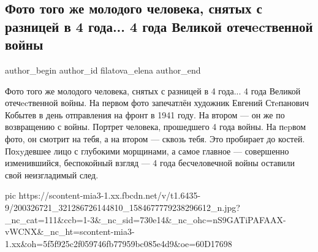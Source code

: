  
 
 
 
 
 
\subsection{Фото того же молодого человека, снятых с разницей в 4 года... 4 года Великой отечecтвенной войны}
\label{sec:17_06_2021.fb.filatova_elena.1.foto_vov_soldat_dusha_vzgljad}
\ifcmt
 author_begin
   author_id filatova_elena
 author_end
\fi

Фото того же молодого человека, снятых с разницей в 4 года... 4 года Великой
отечecтвенной войны. На первом фото запечатлён художник Евгений Стeпанович
Кобытев в день отправления на фронт в 1941 году. На втором — он же по
возвращению с войны. Портрет человека, прошедшего 4 года войны. На пepвом фото,
он смотрит на тебя, а на втором — сквозь тебя. Это пробирает до костей.
Поxyдевшее лицо с глубокими морщинами, а самое главное — совершенно
изменившийся, беспокойный взгляд — 4 года бесчеловечной войны оставили свой
неизгладимый след.

\ifcmt
  pic https://scontent-mia3-1.xx.fbcdn.net/v/t1.6435-9/200326721_321286726144810_1584677779238296612_n.jpg?_nc_cat=111&ccb=1-3&_nc_sid=730e14&_nc_ohc=nS9GATiPAFAAX-vWCNX&_nc_ht=scontent-mia3-1.xx&oh=5f5f925c2f059746fb77959bc085e4d9&oe=60D17698
\fi


